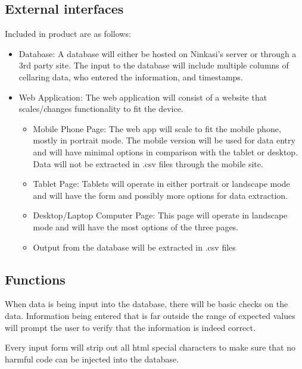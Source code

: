 \documentclass[draftclsnofoot,onecolumn,letterpaper,10pt,compsoc]{IEEEtran}
\begin{document}
	\subsection{External interfaces}
    Included in product are as follows:
        \begin{itemize}
            \item{Database: A database will either be hosted on Ninkasi's server or through a 3rd party site. The input to the database will include multiple columns of cellaring data, who entered the information, and timestamps. }

            \item{Web Application:}
            The web application will consist of a website that scales/changes functionality to fit the device.
                \begin{itemize}
                    \item{Mobile Phone Page: The web app will scale to fit the mobile phone, mostly in portrait mode. The mobile version will be used for data entry and will have minimal options in comparison with the tablet or desktop. Data will not be extracted in .csv files through the mobile site.}

                    \item{Tablet Page: Tablets will operate in either portrait or landscape mode and will have the form and possibly more options for data extraction.}

                    \item{Desktop/Laptop Computer Page: This page will operate in landscape mode and will have the most options of the three pages.}

                    \item{Output from the database will be extracted in .csv files}
                \end{itemize}
        \end{itemize}

	\subsection{Functions}

	When data is being input into the database, there will be basic checks on the data. Information being entered that is far outside the range of expected values will prompt the user to verify that the information is indeed correct.

	Every input form will strip out all html special characters to make sure that no harmful code can be injected into the database.
\end{document}
